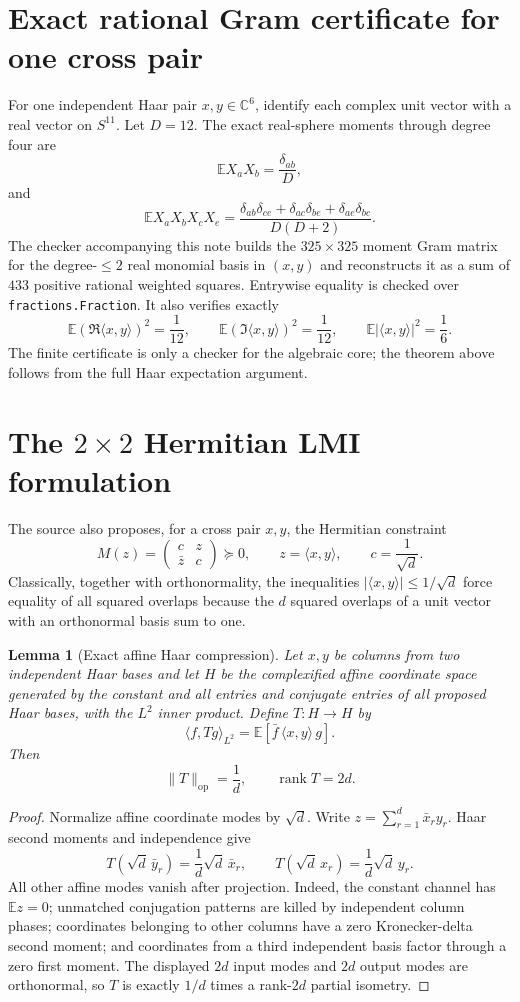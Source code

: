 \documentclass[11pt]{article}
\newtheorem{lemma}{Lemma}
\newcommand{\E}{\mathbb E}
\newcommand{\C}{\mathbb C}
\newcommand{\ip}[2]{\langle #1,#2\rangle}
\begin{document}
\section{Exact rational Gram certificate for one cross pair}
For one independent Haar pair $x,y\in\C^6$, identify each complex unit vector with a real vector on $S^{11}$.  Let $D=12$.  The exact real-sphere moments through degree four are
\[
 \E X_aX_b=\frac{\delta_{ab}}D,
\]
and
\[
 \E X_aX_bX_cX_e
 =\frac{\delta_{ab}\delta_{ce}+\delta_{ac}\delta_{be}+\delta_{ae}\delta_{bc}}{D(D+2)}.
\]
The checker accompanying this note builds the $325\times325$ moment Gram matrix for the degree-$\le2$ real monomial basis in $(x,y)$ and reconstructs it as a sum of $433$ positive rational weighted squares.  Entrywise equality is checked over \texttt{fractions.Fraction}.  It also verifies exactly
\[
 \E(\Re\ip{x}{y})^2=\frac1{12},\qquad
 \E(\Im\ip{x}{y})^2=\frac1{12},\qquad
 \E|\ip{x}{y}|^2=\frac16.
\]
The finite certificate is only a checker for the algebraic core; the theorem above follows from the full Haar expectation argument.

\section{The $2\times2$ Hermitian LMI formulation}
The source also proposes, for a cross pair $x,y$, the Hermitian constraint
\[
 M(z)=
 \begin{pmatrix}
 c&z\\ \bar z&c
 \end{pmatrix}\succeq0,
 \qquad z=\ip{x}{y},\qquad c=\frac1{\sqrt d}.
\]
Classically, together with orthonormality, the inequalities $|\ip{x}{y}|\le1/\sqrt d$ force equality of all squared overlaps because the $d$ squared overlaps of a unit vector with an orthonormal basis sum to one.

\begin{lemma}[Exact affine Haar compression]
Let $x,y$ be columns from two independent Haar bases and let $H$ be the complexified affine coordinate space generated by the constant and all entries and conjugate entries of all proposed Haar bases, with the $L^2$ inner product.  Define $T:H\to H$ by
\[
 \ip{f}{Tg}_{L^2}=\E[\bar f\,\ip{x}{y}\,g].
\]
Then
\[
 \|T\|_{\mathrm{op}}=\frac1d,
 \qquad \operatorname{rank}T=2d.
\]
\end{lemma}

\begin{proof}
Normalize affine coordinate modes by $\sqrt d$.  Write $z=\sum_{r=1}^d\bar x_r y_r$.  Haar second moments and independence give
\[
 T(\sqrt d\,\bar y_r)=\frac1d\sqrt d\,\bar x_r,
 \qquad
 T(\sqrt d\,x_r)=\frac1d\sqrt d\,y_r.
\]
All other affine modes vanish after projection.  Indeed, the constant channel has $\E z=0$; unmatched conjugation patterns are killed by independent column phases; coordinates belonging to other columns have a zero Kronecker-delta second moment; and coordinates from a third independent basis factor through a zero first moment.  The displayed $2d$ input modes and $2d$ output modes are orthonormal, so $T$ is exactly $1/d$ times a rank-$2d$ partial isometry.
\end{proof}
\end{document}
